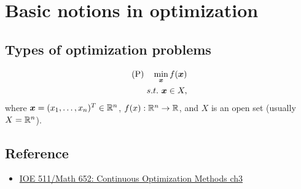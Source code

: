 \chapter{Basic notions in optimization}

\section{Types of optimization problems}
\begin{align*}
    (\text{P})\quad \min_{\boldsymbol{x}} f(\boldsymbol{x})\\
    s.t.\  \boldsymbol{x}\in X,
\end{align*}
where $\boldsymbol{x}=(x_1,\dots,x_n)^T\in\mathbb{R}^n$, $f(x):\mathbb{R}^n\rightarrow\mathbb{R}$, and $X$ is an open set (usually $X=\mathbb{R}^n$).



\section{Reference}
\begin{itemize}
    \item \href{}{IOE 511/Math 652: Continuous Optimization Methods ch3}
\end{itemize}